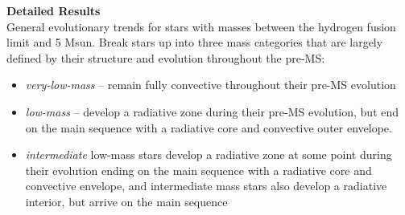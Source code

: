\textbf{Detailed Results} \\
General evolutionary trends for stars with masses between the hydrogen fusion limit and 5 Msun. Break stars up into three mass categories that are largely defined by their structure and evolution throughout the pre-MS: 
\begin{itemize}
 \item[] {\it very-low-mass} -- remain fully convective throughout their pre-MS evolution
 \item[] {\it low-mass} -- develop a radiative zone during their pre-MS evolution, but end on the main sequence with a radiative core and convective outer envelope.
 \item[] {\it intermediate}
low-mass stars develop a radiative zone at some point during their evolution ending on the main sequence with a radiative core and convective envelope, and intermediate mass stars also develop a radiative interior, but arrive on the main sequence
\end{itemize}